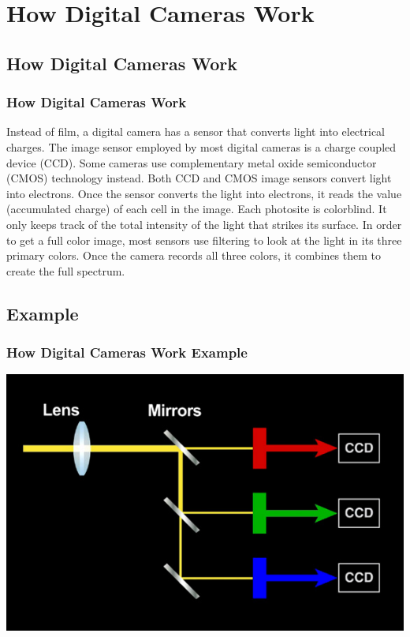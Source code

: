 \documentclass{beamer}
\begin{document}
		
\section{How Digital Cameras Work}

\subsection{How Digital Cameras Work}		

	\begin{frame}
		\frametitle{How Digital Cameras Work}
		\begin{outline}
			\1 Instead of film, a digital camera has a sensor that converts light into electrical charges.
			\1 The image sensor employed by most digital cameras is a charge coupled device (CCD). 
			\2 Some cameras use complementary metal oxide semiconductor (CMOS) technology instead. 
			\2 Both CCD and CMOS image sensors convert light into electrons.
			\1 Once the sensor converts the light into electrons, it reads the value (accumulated charge) of each cell in the image. 
			\1 Each photosite is colorblind. It only keeps track of the total intensity of the light that strikes its surface. 
			\2 In order to get a full color image, most sensors use filtering to look at the light in its three primary colors. 
			\2 Once the camera records all three colors, it combines them to create the full spectrum.
		\end{outline}
	\end{frame}


\subsection{Example}		
	\begin{frame}
		\frametitle{How Digital Cameras Work Example}
		\begin{center}
			\includegraphics[width=1.0\textwidth]{images/digital-camera-work.jpg}
		\end{center}
	\end{frame}
\end{document}
